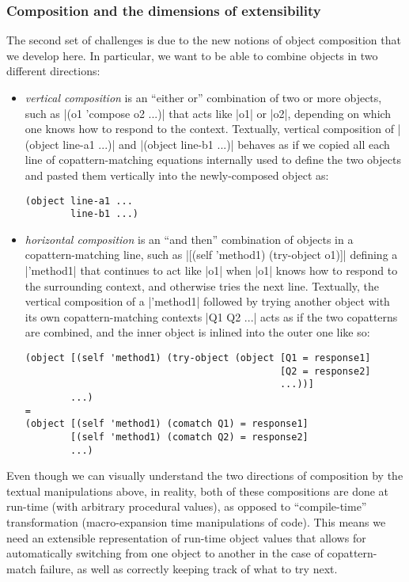 \subsubsection{Composition and the dimensions of extensibility}
\label{sec:composition-challenges}

The second set of challenges is due to the new notions of object composition that we develop here.
In particular, we want to be able to combine objects in two different directions:
\begin{itemize}
\item
  \emph{vertical composition} is an ``either or'' combination of two or more objects, such as \scm|(o1 'compose o2 ...)| that acts like \scm|o1| or \scm|o2|, \etc[,] depending on which one knows how to respond to the context.
  Textually, vertical composition of \scm|(object line-a1 ...)| and \scm|(object line-b1 ...)| behaves as if we copied all each line of copattern-matching equations internally used to define the two objects and pasted them vertically into the newly-composed object as:
\begin{verbatim}
(object line-a1 ...
        line-b1 ...)
\end{verbatim}
\item
  \emph{horizontal composition} is an ``and then'' combination of objects in a copattern-matching line, such as \scm|[(self 'method1) (try-object o1)]| defining a \scm|'method1| that continues to act like \scm|o1| when \scm|o1| knows how to respond to the surrounding context, and otherwise tries the next line.
  Textually, the vertical composition of a \scm|'method1| followed by trying another object with its own copattern-matching contexts \scm|Q1 Q2 ...| acts as if the two copatterns are combined, and the inner object is inlined into the outer one like so:
\begin{verbatim}
(object [(self 'method1) (try-object (object [Q1 = response1]
                                             [Q2 = response2]
                                             ...))]
        ...)
=
(object [(self 'method1) (comatch Q1) = response1]
        [(self 'method1) (comatch Q2) = response2]
        ...)
\end{verbatim}
\end{itemize}

Even though we can visually understand the two directions of composition by the textual manipulations above, in reality, both of these compositions are done at run-time (\ie with arbitrary procedural values), as opposed to ``compile-time'' transformation (\ie macro-expansion time manipulations of code).
This means we need an extensible representation of run-time object values that allows for automatically switching from one object to another in the case of copattern-match failure, as well as correctly keeping track of what to try next.

